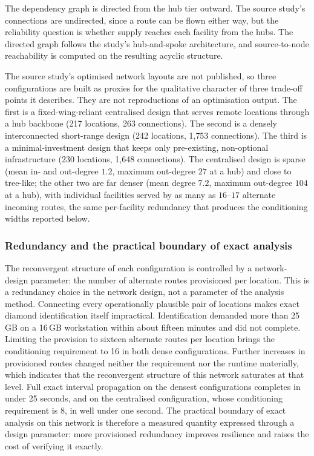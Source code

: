 \documentclass[preprint,12pt]{elsarticle}
\begin{document}
The dependency graph is directed from the hub tier outward. The source study's connections are undirected, since a route can be flown either way, but the reliability question is whether supply reaches each facility from the hubs. The directed graph follows the study's hub-and-spoke architecture, and source-to-node reachability is computed on the resulting acyclic structure.

The source study's optimised network layouts are not published, so three configurations are built as proxies for the qualitative character of three trade-off points it describes. They are not reproductions of an optimisation output. The first is a fixed-wing-reliant centralised design that serves remote locations through a hub backbone (217 locations, 263 connections). The second is a densely interconnected short-range design (242 locations, 1{,}753 connections). The third is a minimal-investment design that keeps only pre-existing, non-optional infrastructure (230 locations, 1{,}648 connections). The centralised design is sparse (mean in- and out-degree $1.2$, maximum out-degree $27$ at a hub) and close to tree-like; the other two are far denser (mean degree $7.2$, maximum out-degree $104$ at a hub), with individual facilities served by as many as $16$--$17$ alternate incoming routes, the same per-facility redundancy that produces the conditioning widths reported below.

\subsubsection{Redundancy and the practical boundary of exact analysis}\label{sec:redundancy}

The reconvergent structure of each configuration is controlled by a network-design parameter: the number of alternate routes provisioned per location. This is a redundancy choice in the network design, not a parameter of the analysis method. Connecting every operationally plausible pair of locations makes exact diamond identification itself impractical. Identification demanded more than 25\,GB on a 16\,GB workstation within about fifteen minutes and did not complete. Limiting the provision to sixteen alternate routes per location brings the conditioning requirement to 16 in both dense configurations. Further increases in provisioned routes changed neither the requirement nor the runtime materially, which indicates that the reconvergent structure of this network saturates at that level. Full exact interval propagation on the densest configurations completes in under 25 seconds, and on the centralised configuration, whose conditioning requirement is 8, in well under one second. The practical boundary of exact analysis on this network is therefore a measured quantity expressed through a design parameter: more provisioned redundancy improves resilience and raises the cost of verifying it exactly.
\end{document}
